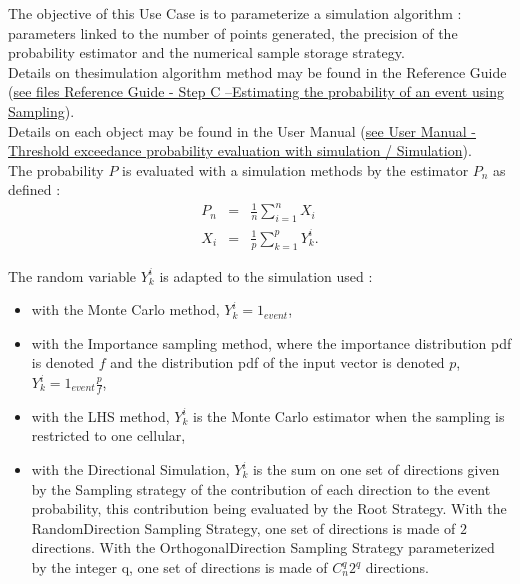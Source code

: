 \renewcommand{\filename}{docUC_ThresholdExceedance_SimulationAlgoParametrisation.tex}
\renewcommand{\filetitle}{UC : Parametrisation of a simulation algorithm}

\HeaderIIILevel

\label{simuParam}



The objective of this Use Case is to parameterize a simulation algorithm : parameters linked to the number of points generated, the precision of the probability estimator and the numerical sample storage strategy.\\

Details on thesimulation algorithm method may be found in the Reference Guide (\href{OpenTURNS_ReferenceGuide.pdf}{see files Reference Guide - Step C --Estimating the probability of an event using Sampling}).\\

Details on each object may be found in the User Manual  (\href{OpenTURNS_UserManual_TUI.pdf}{see User Manual - Threshold exceedance probability evaluation with simulation / Simulation}).\\

The probability $P$ is evaluated with a simulation methods by the estimator $P_n$ as defined :
\begin{eqnarray}
  P_n & = & \displaystyle \frac{1}{n} \sum_{i=1}^{n} X_i\\
  X_i & = & \displaystyle \frac{1}{p} \sum_{k=1}^{p} Y_k^i.
\end{eqnarray}

The random variable $Y_k^i$ is adapted to the simulation used :
\begin{itemize}
\item with the Monte Carlo method, $Y_k^i = 1_{event}$,
\item with the Importance sampling method, where the importance distribution pdf is denoted  $f$ and the distribution pdf of the input vector is denoted $p$, $Y_k^i = 1_{event}\frac{p}{f}$,
\item with the LHS method, $Y_k^i$ is the Monte Carlo estimator when the sampling is restricted to one cellular,
\item with the Directional Simulation, $Y_k^i$ is the sum on one set of directions given by the Sampling strategy of the contribution of each direction to the event probability, this contribution being evaluated by the Root Strategy. With the RandomDirection Sampling Strategy, one set of directions is made of $2$ directions. With the OrthogonalDirection Sampling Strategy parameterized by the integer q, one set of directions is made of $C_n^q 2^q$ directions.
\end{itemize}
\vspace*{0.5cm}


